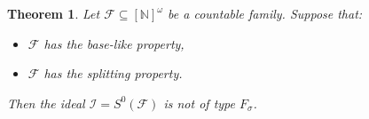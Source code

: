 \documentclass{amsart}
\newtheorem{thm}{Theorem}[section]
\theoremstyle{definition}
\theoremstyle{definition}
\newcommand{\N}{{\mathbb N}}
\newcommand{\I}{\mathcal I}
\newcommand{\InfSubs}{[\N]^{\omega}}
\newcommand{\MB}{S^0}  %
\begin{document}
\begin{thm} \label{thmFsigma}
Let $\mathcal{F}\subseteq \InfSubs$ be a countable family. Suppose that: 
\begin{itemize}
	\item[$(i)$] $\mathcal{F}$ has the base-like property,
	\item[$(ii)$] $\mathcal{F}$ has the splitting property.
\end{itemize} 
Then the ideal $\I=\MB(\mathcal{F})$ is not of type $F_{\sigma}$.
\end{thm}

\end{document}
